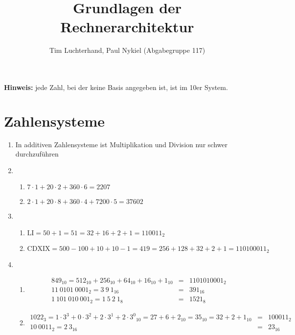 \documentclass[DIN, pagenumber=false, fontsize=11pt, parskip=half]{scrartcl}
\title{Grundlagen der Rechnerarchitektur}
\author{Tim Luchterhand, Paul Nykiel (Abgabegruppe 117)}
\begin{document}
    \maketitle
    \textbf{Hinweis: } jede Zahl, bei der keine Basis angegeben ist, ist im 10er System.
    \section{Zahlensysteme}
    \begin{enumerate}
        \item In additiven Zahlensysteme ist Multiplikation und Division nur schwer durchzuführen
        \item 
            \begin{enumerate}
                \item $7\cdot1 + 20\cdot2 + 360\cdot6 = 2207$
                \item $2\cdot1 + 20\cdot8 + 360\cdot4 + 7200\cdot5 = 37602$
            \end{enumerate}
        \item 
            \begin{enumerate}
                \item $\text{LI} = 50 + 1 = 51 = 32 + 16 + 2 + 1 = {110011}_2$
                \item $\text{CDXIX} = 500 - 100 + 10 + 10 - 1 = 419 = 256 + 128 + 32 + 2 + 1 = {110100011}_2$
            \end{enumerate}
        \item 
            \begin{enumerate}
                \item 
                    \begin{eqnarray*}
                        {849}_{10} = {512}_{10} + {256}_{10} + {64}_{10} + {16}_{10} + {1}_{10} &=& {1101010001}_2 \\
                        {11\ 0101\ 0001}_2 = {3\ 9\ 1}_{16} &=& {391}_{16}\\
                        {1\ 101\ 010\ 001}_2 = {1\ 5\ 2\ 1}_{8} &=& {1521}_8
                    \end{eqnarray*}
                \item 
                    \begin{eqnarray*}
                        {1022}_{3} = {1\cdot3^3 + 0\cdot3^2 + 2\cdot3^1 + 2\cdot3^0}_{10} = {27 + 6 + 2}_{10} = {35}_{10} = {32 + 2 + 1}_{10} &=& {100011}_{2}\\
                        {10\ 0011}_2 = {2\ 3}_{16} &=& {23}_{16} \\

\end{eqnarray*}
\end{enumerate}
\end{enumerate}
\end{document}
